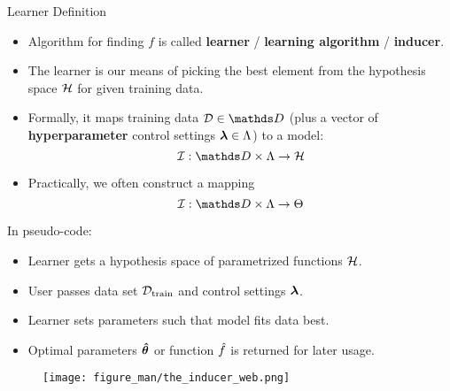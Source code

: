 \documentclass[11pt,compress,t,notes=noshow, xcolor=table]{beamer}
\begin{document}
\begin{vbframe}{Learner Definition}
  
  \begin{itemize}
    
    \item Algorithm for finding  $f$ is called \textbf{learner} / \textbf{learning algorithm} /  \textbf{inducer}.
    
    \item %
    The learner is our means of picking the best element from the hypothesis space $\mathcal{H}$
    for given training data.
    
    \item Formally, it maps training data $\D \in \allDatasets$ (plus a vector of \textbf{hyperparameter} control settings $\bm{\lambda} \in \Lambda$) to a model:
    \vspace{-10ex}
    {
\[\ind: \preimageInducerShort \rightarrow \Hspace\]
    }
    \vspace{-10ex}
    \item Practically, we often construct a mapping 
\[\ind: \preimageInducerShort \rightarrow \Theta\]
  \end{itemize}
  
  
  \framebreak
  
  In pseudo-code:
  \begin{itemize}
    \item Learner gets a hypothesis space of parametrized functions $\mathcal{H}$.
    \item User passes data set $\mathcal{D}_{\text{train}}$ and control settings $\bm{\lambda}$.
    \item Learner sets parameters such that model 
    fits data best.
    \item Optimal parameters $\bm{\hat\theta}$ or function $\hat{f}$ is returned for later usage.
    
  \end{itemize}
  
  \begin{figure}
    \texttt{[image: figure\_man/the\_inducer\_web.png]}
  \end{figure}
  
  
\end{vbframe}


\endlecture
\end{document}
